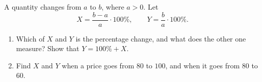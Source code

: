 A quantity changes from $a$ to $b$, where $a>0$. Let
\[X=\dfrac{b-a}{a}\cdot100\%,\qquad Y=\dfrac ba\cdot100\%.\]
\begin{enumerate}
\item[(a)] Which of $X$ and $Y$ is the percentage change, and what does the other one measure? Show that $Y=100\%+X$.
\item[(b)] Find $X$ and $Y$ when a price goes from $80$ to $100$, and when it goes from $80$ to $60$.
\end{enumerate}
